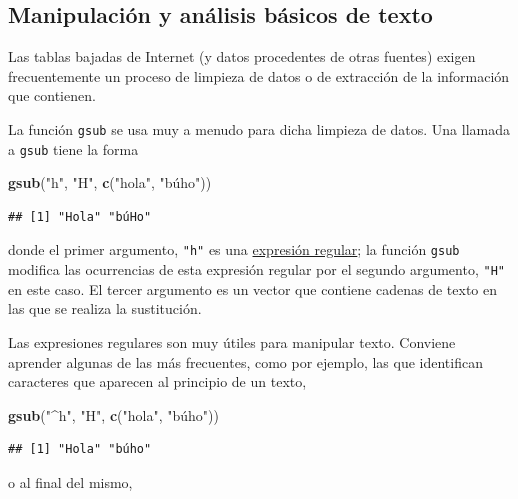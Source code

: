 \documentclass[]{article}
\newenvironment{Shaded}{\begin{snugshade}}{\end{snugshade}}
\newcommand{\KeywordTok}[1]{\textcolor[rgb]{0.13,0.29,0.53}{\textbf{#1}}}
\newcommand{\StringTok}[1]{\textcolor[rgb]{0.31,0.60,0.02}{#1}}
\newcommand{\NormalTok}[1]{#1}
\begin{document}
\subsection{Manipulación y análisis básicos de
texto}\label{manipulacion-y-analisis-basicos-de-texto}

Las tablas bajadas de Internet (y datos procedentes de otras fuentes)
exigen frecuentemente un proceso de limpieza de datos o de extracción de
la información que contienen.

La función \texttt{gsub} se usa muy a menudo para dicha limpieza de
datos. Una llamada a \texttt{gsub} tiene la forma

\begin{Shaded}
\begin{Highlighting}[]
\KeywordTok{gsub}\NormalTok{(}\StringTok{"h"}\NormalTok{, }\StringTok{"H"}\NormalTok{, }\KeywordTok{c}\NormalTok{(}\StringTok{"hola"}\NormalTok{, }\StringTok{"búho"))}
\end{Highlighting}
\end{Shaded}

\begin{verbatim}
## [1] "Hola" "búHo"
\end{verbatim}

donde el primer argumento, \texttt{"h"} es una
\href{https://es.wikipedia.org/wiki/Expresi\%C3\%B3n_regular}{expresión
regular}; la función \texttt{gsub} modifica las ocurrencias de esta
expresión regular por el segundo argumento, \texttt{"H"} en este caso.
El tercer argumento es un vector que contiene cadenas de texto en las
que se realiza la sustitución.

Las expresiones regulares son muy útiles para manipular texto. Conviene
aprender algunas de las más frecuentes, como por ejemplo, las que
identifican caracteres que aparecen al principio de un texto,

\begin{Shaded}
\begin{Highlighting}[]
\KeywordTok{gsub}\NormalTok{(}\StringTok{"^h"}\NormalTok{, }\StringTok{"H"}\NormalTok{, }\KeywordTok{c}\NormalTok{(}\StringTok{"hola"}\NormalTok{, }\StringTok{"búho"))}
\end{Highlighting}
\end{Shaded}

\begin{verbatim}
## [1] "Hola" "búho"
\end{verbatim}

o al final del mismo,
\end{document}

